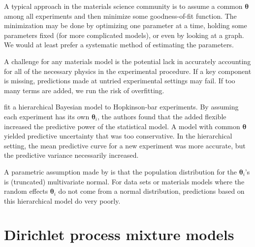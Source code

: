 \documentclass[12pt]{article}
\newcommand{\m}[1]{\mathbf{\bm{#1}}}
\begin{document}
A typical approach in the materials science community is to assume a common $\m{\theta}$ among all experiments and then minimize some goodness-of-fit function. The minimization may be done by optimizing one parameter at a time, holding some parameters fixed (for more complicated models), or even by looking at a graph. We would at least prefer a systematic method of estimating the parameters.

A challenge for any materials model is the potential lack in accurately accounting for all of the necessary physics in the experimental procedure. If a key component is missing, predictions made at untried experimental settings may fail. If too many terms are added, we run the risk of overfitting.

\cite{fugate2005hierarchical} fit a hierarchical Bayesian model to Hopkinson-bar experiments. By assuming each experiment has its own $\m{\theta}_i$, the authors found that the added flexible increased the predictive power of the statistical model. A model with common $\m{\theta}$ yielded predictive uncertainty that was too conservative. In the hierarchical setting, the mean predictive curve for a new experiment was more accurate, but the predictive variance necessarily increased.

A parametric assumption made by \cite{fugate2005hierarchical} is that the population distribution for the $\m{\theta}_i$'s is (truncated) multivariate normal. For data sets or materials models where the random effects $\m{\theta}_i$ do not come from a normal distribution, predictions based on this hierarchical model do very poorly.

\section{Dirichlet process mixture models}
\end{document}
